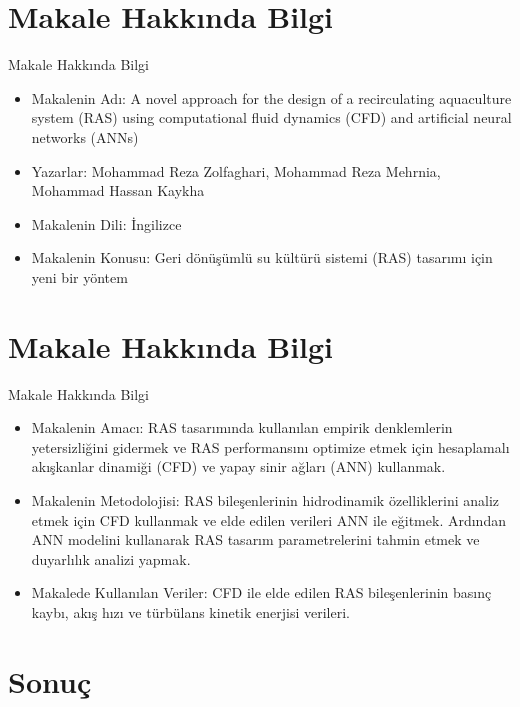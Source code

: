 \documentclass{beamer}
\begin{document}
\section{Makale Hakkında Bilgi}

\begin{frame}{Makale Hakkında Bilgi}
\begin{itemize}
  \item Makalenin Adı: A novel approach for the design of a recirculating aquaculture system (RAS) using computational fluid dynamics (CFD) and artificial neural networks (ANNs)
   \vskip 0.5cm
  \item Yazarlar: Mohammad Reza Zolfaghari, Mohammad Reza Mehrnia, Mohammad Hassan Kaykha
   \vskip 0.5cm
  \item Makalenin Dili: İngilizce
   \vskip 0.5cm
  \item Makalenin Konusu: Geri dönüşümlü su kültürü sistemi (RAS) tasarımı için yeni bir yöntem
\end{itemize}
\end{frame}

\section{Makale Hakkında Bilgi}

\begin{frame}{Makale Hakkında Bilgi}
\begin{itemize}
  \item Makalenin Amacı: RAS tasarımında kullanılan empirik denklemlerin yetersizliğini gidermek ve RAS performansını optimize etmek için hesaplamalı akışkanlar dinamiği (CFD) ve yapay sinir ağları (ANN) kullanmak.
   \vskip 0.5cm
  \item Makalenin Metodolojisi: RAS bileşenlerinin hidrodinamik özelliklerini analiz etmek için CFD kullanmak ve elde edilen verileri ANN ile eğitmek. Ardından ANN modelini kullanarak RAS tasarım parametrelerini tahmin etmek ve duyarlılık analizi yapmak.
   \vskip 0.5cm
  \item Makalede Kullanılan Veriler: CFD ile elde edilen RAS bileşenlerinin basınç kaybı, akış hızı ve türbülans kinetik enerjisi verileri.
\end{itemize}
\end{frame}

\section{Sonuç}
\end{document}
